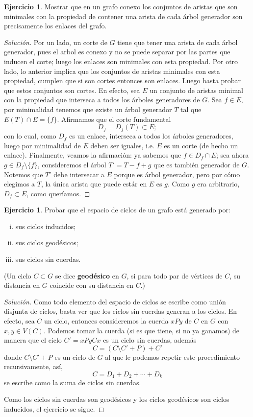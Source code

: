 \documentclass[12pt]{report}
\theoremstyle{plain}
\theoremstyle{definition}
\newtheorem{exercise}[theorem]{Ejercicio}
\newenvironment{solution}{\begin{proof}[Solución]}{\end{proof}}
\begin{document}
\begin{exercise}
    Mostrar que en un grafo conexo los conjuntos de aristas que son minimales con la propiedad de contener una arista
     de cada árbol generador son precisamente los enlaces del grafo.
\end{exercise}
\begin{solution}
    Por un lado, un corte de $G$ tiene que tener una arista de cada árbol generador, pues el arbol es conexo y no se
    puede separar por las partes que inducen el corte; luego los enlaces son minimales con esta propiedad. Por otro
    lado, lo anterior implica que los conjuntos de aristas minimales con esta propiedad, cumplen que si son cortes
    entonces son enlaces. Luego basta probar que estos conjuntos son cortes. En efecto, sea $E$ un conjunto de
    aristas minimal con la propiedad que interseca a todos los árboles generadores de $G$. Sea $f \in E$, por
    minimalidad tenemos que existe un árbol generador $T$ tal que $E(T) \cap E = \{f \}$. Afirmamos que el corte
    fundamental
    \[
        D_f = D_f(T) \subset E;
    \]
    con lo cual, como $D_f$ es un enlace, interseca a todos los árboles generadores, luego por minimalidad de $E$
    deben ser iguales, i.e. $E$ es un corte (de hecho un enlace). Finalmente, veamos la afirmación: ya sabemos que $f \in D_f \cap E$; sea ahora $g \in D_f \setminus \{f\}$, consideremos el árbol $T' = T - f + g$ que es también generador de $G$. Notemos que $T'$ debe intersecar a $E$ porque es árbol generador, pero por cómo elegimos a $T$, la única arista que puede estár en $E$ es $g$. Como $g$ era arbitrario, $D_f \subset E$, como queríamos.
\end{solution}

\begin{exercise}
    Probar que el espacio de ciclos de un grafo está generado por:
    \begin{enumerate}[(i)]
    \item sus ciclos inducidos;
    \item sus ciclos geodésicos;
    \item sus ciclos sin cuerdas.
    \end{enumerate}
    (Un ciclo $C \subset G$ se dice \textbf{geodésico} en $G$, si para todo par de vértices de $C$, su distancia en $
    G$ coincide con su distancia en $C$.)
\end{exercise}
\begin{solution}
Como todo elemento del espacio de ciclos se escribe como unión disjunta de ciclos, basta ver que los ciclos
sin cuerdas generan a los ciclos. En efecto, sea $C$ un ciclo, entonces consideremos la cuerda $xPy$ de $C$ en $G$
con $x,
y \in V(C)$. Podemos tomar la cuerda (si es que tiene, si no ya ganamos) de manera que el ciclo $C' = xPyCx$ es un
ciclo sin cuerdas, además
\[
    C = (C \setminus C' + P) + C'
\]
donde $C \setminus C' + P$ es un ciclo de $G$ al que le podemos repetir este procedimiento
recursivamente, así,
\[
    C = D_1 + D_2 + \cdots + D_k
\]
se escribe como la suma de ciclos sin cuerdas.

Como los ciclos sin cuerdas son geodésicos y los ciclos geodésicos son ciclos inducidos, el ejercicio se sigue.
\end{solution}
\end{document}
